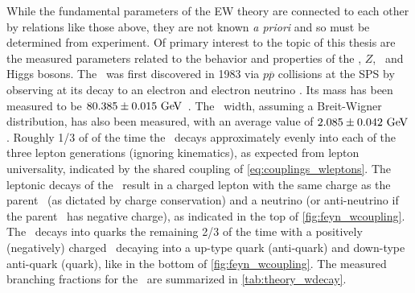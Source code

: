 


While the fundamental parameters of the EW theory are connected to each other
by relations like those above, they are not known \emph{a priori} 
and so must be determined from experiment.
Of primary interest to the topic of this thesis 
are the measured parameters related to the behavior and properties
of the \dubya, $Z$, ~and Higgs bosons.
The \dubya~was first discovered in 1983 via $p\overline{p}$ collisions
at the SPS by observing at its decay to an electron %
and electron neutrino \cite{ARNISON1983103}.
Its mass has been measured 
to be $80.385 \pm 0.015\GeV$~\cite{PDG:2014}.
The \dubya~width, assuming a Breit-Wigner distribution, has also been measured,
with an average value of $2.085\pm0.042\GeV$ \cite{PDG:2014}.
Roughly 1/3 of of the time the \dubya~decays approximately 
evenly into each of the three lepton generations (ignoring kinematics),
as expected from lepton universality,  
indicated by the shared coupling of \eqn\eqref{eq:couplings_wleptons}.
The leptonic decays of the \dubya~result in a charged lepton 
with the same charge as the parent \dubya~(as dictated by charge conservation)
and a neutrino (or anti-neutrino if the parent \dubya~has negative charge),
as indicated in the top of \fig\ref{fig:feyn_wcoupling}.
The \dubya~decays into quarks the remaining 2/3 of the time with a positively
(negatively) charged \dubya~decaying into a up-type quark (anti-quark) 
and down-type anti-quark (quark),
like in the bottom of \fig\ref{fig:feyn_wcoupling}.
The measured branching fractions for the \dubya~are 
summarized in \tab\ref{tab:theory_wdecay}.

